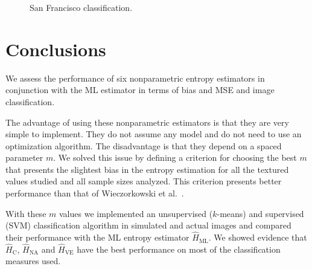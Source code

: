 \documentclass[journal]{IEEEtran}
\begin{document}
\begin{figure}[hbt]
	\caption{San Francisco classification.}
	\label{fig:class_SF}
\end{figure}    

\section{Conclusions}
\label{sec:conclusions}

We assess the performance of six nonparametric entropy estimators in conjunction with the ML estimator in terms of bias and MSE and image classification. 

The advantage of using these nonparametric estimators is that they are very simple to implement. They do not assume any model and do not need to use an optimization algorithm. The disadvantage is that they depend on a spaced parameter $m$. We solved this issue by defining a criterion for choosing the best $m$ that presents the slightest bias in the entropy estimation for all the textured values studied and all sample sizes analyzed. This criterion presents better performance than that of Wieczorkowski et al.~\cite{Wieczorkowski1999}.

With these $m$ values we implemented an unsupervised ($k$-means) and supervised (SVM) classification  algorithm in simulated and actual images and compared their performance with the ML entropy estimator $\widehat{H}_{\text{ML}}$. 
We showed evidence that $\widehat{H}_\text{C}$, $\widehat{H}_{\text{NA}}$ and $\widehat{H}_{\text{VE}}$ have the best performance on most of the classification measures used. 
\end{document}
